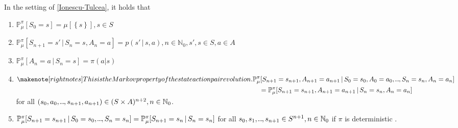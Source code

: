 \begin{corollary}
    In the setting of \cref{Ionescu-Tulcea}, it holds that
    \begin{enumerate}
        \item \( \mathbb{P}_\mu^\pi[S_{0} = s] = \mu[\left\{ s \right\}], s \in S \)
        \item \( \mathbb{P}_\mu^\pi [S_{n+1} = s' \,|\, S_n = s, A_n = a] = p(s' \,|\, s,a), n \in \mathbb{N}_{0}, s',s \in S, a \in A \)
        \item  \( \mathbb{P}_\mu^\pi[A_{n} = a \,|\, S_{n} = s] = \pi(a | s) \)
        \item \( \begin{aligned}[t]\note{This is the Markov property of the state action pair evolution.}
             & \mathbb{P}_\mu^\pi [ S_{n+1} = s_{n+1}, A_{n+1} = a_{n+1} \,|\, S_{0} = s_{0}, A_{0} = a_{0}, \mydots, S_n = s_n, A_n = a_n] \\
             &\quad =  \mathbb{P}_{\mu}^\pi[S_{n+1} = s_{n+1}, A_{n+1} = a_{n+1} \,|\, S_n = s_n, A_n = a_n]\\[0.2em]
        \end{aligned} \)   for all \( (s_{0},a_{0},\kern-0.10em.\kern-0.06em.\kern-0.06em.\kern-0.1em,s_{n+1}, a_{n+1}) \in (S \times A)^{n+2}, n \in \mathbb{N}_{0} \).
        \item \( \mathbb{P}_\mu^\pi[S_{n+1} = s_{n+1} \,|\, S_{0} = s_{0},\kern-0.10em.\kern-0.06em.\kern-0.06em.\kern-0.1em, S_n = s_n] = \mathbb{P}_\mu^\pi[ S_{n+1} = s_n \,|\, S_n = s_n]\) 
        for all \( s_{0},s_{1},\kern-0.10em.\kern-0.06em.\kern-0.06em.\kern-0.1em,s_{n+1} \in S^{n+1}, n \in \mathbb{N}_{0}\) if \( \pi \) is deterministic .  
    \end{enumerate}
\end{corollary}


